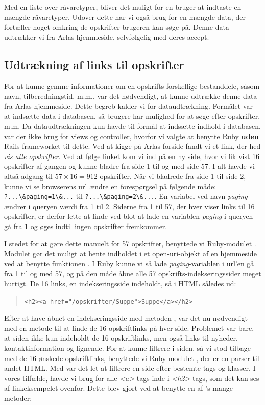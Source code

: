 Med en liste over råvaretyper, bliver det muligt for en bruger at indtaste en mængde råvaretyper. Udover dette har vi også brug for en mængde data, der fortæller noget omkring de opskrifter brugeren kan søge på. Denne data udtrækker vi fra Arlas hjemmeside, selvfølgelig med deres accept.

\subsection{Udtrækning af links til opskrifter}

For at kunne gemme informationer om en opskrifts forskellige bestanddele, såsom navn, tilberedningstid, m.m., var det nødvendigt, at kunne udtrække denne data fra Arlas hjemmeside. Dette begreb kalder vi for dataudtrækning. Formålet var at indsætte data i databasen, så brugere har mulighed for at søge efter opskrifter, m.m. Da dataudtrækningen kun havde til formål at indsætte indhold i databasen, var der ikke brug for views og controller, hvorfor vi valgte at benytte Ruby \textbf{uden} Rails frameworket til dette.
Ved at kigge på Arlas forside fandt vi et link, der hed \textit{vis alle opskrifter}. Ved at følge linket kom vi ind på en ny side, hvor vi fik vist 16 opskrifter af gangen og kunne bladre fra side 1 til og med side 57. I alt havde vi altså adgang til $57 \times 16 = 912$ opskrifter. Når vi bladrede fra side 1 til side 2, kunne vi se browserens url ændre en forespørgsel på følgende måde:
\lstinline{?...\&paging=1\&...} til \lstinline{?...\&paging=2\&...}. En variabel ved navn \textit{paging} ændrer i queryen værdi fra 1 til 2. Siderne fra 1 til 57, der hver viser links til 16 opskrifter, er derfor lette at finde ved blot at lade en variablen \textit{paging} i queryen gå fra 1 og øges indtil ingen opskrifter fremkommer.

I stedet for at gøre dette manuelt for 57 opskrifter, benyttede vi Ruby-modulet . Modulet gør det muligt at hente indholdet i et open-uri-objekt af en hjemmeside ved at benytte funktionen . I Ruby kunne vi så lade \textit{paging}-variablen i url'en gå fra 1 til og med 57, og på den måde åbne alle 57 opskrifts-indekseringssider meget hurtigt. De 16 links, en indekseringsside indeholdt, så i HTML således ud:

\begin{quote}
  \lstinline{<h2><a href="/opskrifter/Suppe">Suppe</a></h2>}
\end{quote}

Efter at have åbnet en indekseringsside med metoden , var det nu nødvendigt med en metode til at finde de 16 opskriftlinks på hver side. Problemet var bare, at siden ikke kun indeholdt de 16 opskriftlinks, men også links til nyheder, kontaktinformation og lignende. For at kunne filtrere i siden, så vi stod tilbage med de 16 ønskede opskriftlinks, benyttede vi Ruby-modulet \cite{rubygemnokogiri}, der er en parser til andet HTML. Med  var det let at filtrere en side efter bestemte tags og klasser. I vores tilfælde, havde vi brug for alle \textit{<a>} tags inde i \textit{<h2>} tags, som det kan ses af linkeksempelet ovenfor. Dette blev gjort ved at benytte en af 's mange metoder:

